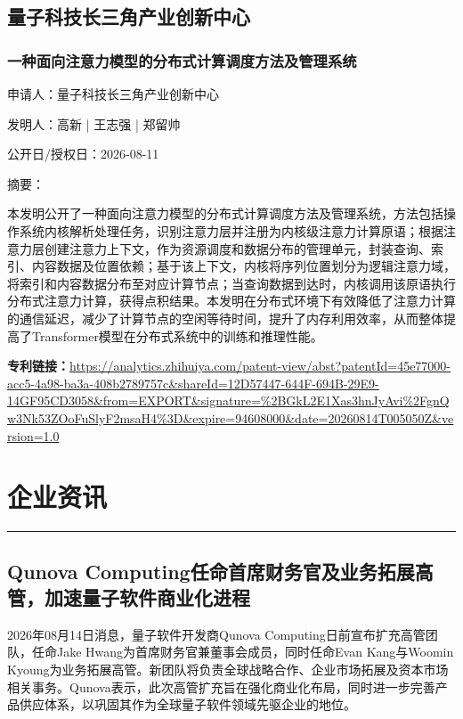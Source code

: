 \documentclass[12pt,a4paper]{ctexart}
\begin{document}
\subsection{ 量子科技长三角产业创新中心 }

\subsubsection{ 一种面向注意力模型的分布式计算调度方法及管理系统 }

申请人：量子科技长三角产业创新中心

发明人：高新 | 王志强 | 郑留帅

公开日/授权日：2026-08-11

摘要：

本发明公开了一种面向注意力模型的分布式计算调度方法及管理系统，方法包括操作系统内核解析处理任务，识别注意力层并注册为内核级注意力计算原语；根据注意力层创建注意力上下文，作为资源调度和数据分布的管理单元，封装查询、索引、内容数据及位置依赖；基于该上下文，内核将序列位置划分为逻辑注意力域，将索引和内容数据分布至对应计算节点；当查询数据到达时，内核调用该原语执行分布式注意力计算，获得点积结果。本发明在分布式环境下有效降低了注意力计算的通信延迟，减少了计算节点的空闲等待时间，提升了内存利用效率，从而整体提高了Transformer模型在分布式系统中的训练和推理性能。

\noindent\textbf{专利链接：}\url{https://analytics.zhihuiya.com/patent-view/abst?patentId=45e77000-acc5-4a98-ba3a-408b2789757c&shareId=12D57447-644F-694B-29E9-14GF95CD3058&from=EXPORT&signature=%2BGkL2E1Xas3hnJyAvi%2FgnQw3Nk53ZOoFuSlyF2msaH4%3D&expire=94608000&date=20260814T005050Z&version=1.0}




\newpage
\section{企业资讯}
\vspace{-0.5em}
\noindent\rule{\linewidth}{1.5pt}

\subsection{ Qunova Computing任命首席财务官及业务拓展高管，加速量子软件商业化进程 }

2026年08月14日消息，量子软件开发商Qunova Computing日前宣布扩充高管团队，任命Jake Hwang为首席财务官兼董事会成员，同时任命Evan Kang与Woomin Kyoung为业务拓展高管。新团队将负责全球战略合作、企业市场拓展及资本市场相关事务。Qunova表示，此次高管扩充旨在强化商业化布局，同时进一步完善产品供应体系，以巩固其作为全球量子软件领域先驱企业的地位。
\end{document}
